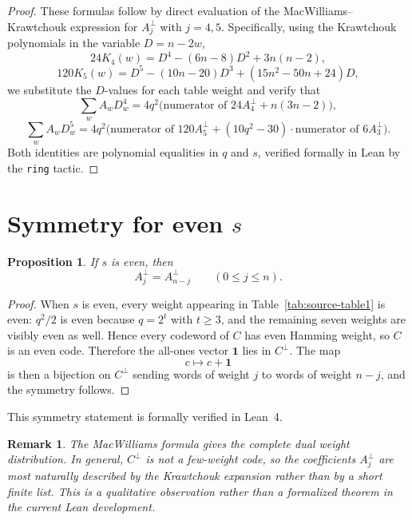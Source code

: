\documentclass[11pt]{article}
\newtheorem{proposition}[theorem]{Proposition}
\newtheorem{remark}[theorem]{Remark}
\begin{document}
\begin{proof}
These formulas follow by direct evaluation of the MacWilliams--Krawtchouk expression for $A_j^{\perp}$ with $j=4,5$. Specifically, using the Krawtchouk polynomials in the variable $D=n-2w$,
\begin{equation}
24 K_4(w) = D^4-(6n-8)D^2+3n(n-2),
\end{equation}
\begin{equation}
120 K_5(w) = D^5-(10n-20)D^3+(15n^2-50n+24)D,
\end{equation}
we substitute the $D$-values for each table weight and verify that
\begin{equation}
\sum_w A_w D_w^4 = 4q^2\bigl(\text{numerator of } 24A_4^{\perp}+n(3n-2)\bigr),
\end{equation}
\begin{equation}
\sum_w A_w D_w^5 = 4q^2\bigl(\text{numerator of } 120A_5^{\perp}+(10q^2-30)\cdot\text{numerator of } 6A_3^{\perp}\bigr).
\end{equation}
Both identities are polynomial equalities in $q$ and $s$, verified formally in Lean by the \texttt{ring} tactic.
\end{proof}

\section{Symmetry for even $s$}

\begin{proposition}
If $s$ is even, then
\begin{equation}
A_j^{\perp}=A_{n-j}^{\perp}
\qquad
(0\le j\le n).
\end{equation}
\end{proposition}

\begin{proof}
When $s$ is even, every weight appearing in Table~\ref{tab:source-table1} is even: $q^2/2$ is even because $q=2^t$ with $t\ge 3$, and the remaining seven weights are visibly even as well. Hence every codeword of $C$ has even Hamming weight, so $C$ is an even code. Therefore the all-ones vector $\mathbf{1}$ lies in $C^{\perp}$. The map
\begin{equation}
c\longmapsto c+\mathbf{1}
\end{equation}
is then a bijection on $C^{\perp}$ sending words of weight $j$ to words of weight $n-j$, and the symmetry follows.
\end{proof}

This symmetry statement is formally verified in Lean~4.

\begin{remark}
The MacWilliams formula gives the complete dual weight distribution. In general, $C^{\perp}$ is not a few-weight code, so the coefficients $A_j^{\perp}$ are most naturally described by the Krawtchouk expansion rather than by a short finite list. This is a qualitative observation rather than a formalized theorem in the current Lean development.
\end{remark}
\end{document}
